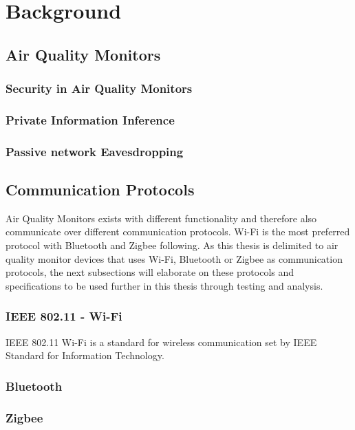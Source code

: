 \chapter*{Background}

\section*{Air Quality Monitors}

\subsection*{Security in Air Quality Monitors}
\subsection*{Private Information Inference}

\subsection*{Passive network Eavesdropping}

\section*{Communication Protocols}
Air Quality Monitors exists with different functionality and therefore also communicate over different communication protocols. Wi-Fi is the most preferred protocol with Bluetooth and Zigbee following. \cite{saini2020indoor} As this thesis is delimited to air quality monitor devices that uses Wi-Fi, Bluetooth or Zigbee as communication protocols, the next subsections will elaborate on these protocols and specifications to be used further in this thesis through testing and analysis. 

\subsection*{IEEE 802.11 - Wi-Fi}
IEEE 802.11 Wi-Fi is a standard for wireless communication set by IEEE Standard for Information Technology. \cite{WifiStandard} 

\subsection*{Bluetooth}

\subsection*{Zigbee}
